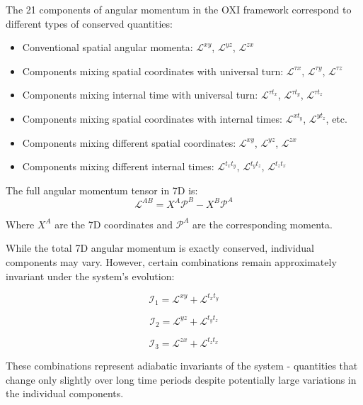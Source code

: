 \documentclass{article}
\begin{document}
The 21 components of angular momentum in the OXI framework correspond to different types of conserved quantities:

\begin{itemize}
\item Conventional spatial angular momenta: $\mathcal{L}^{xy}$, $\mathcal{L}^{yz}$, $\mathcal{L}^{zx}$
\item Components mixing spatial coordinates with universal turn: $\mathcal{L}^{\tau x}$, $\mathcal{L}^{\tau y}$, $\mathcal{L}^{\tau z}$
\item Components mixing internal time with universal turn: $\mathcal{L}^{\tau t_x}$, $\mathcal{L}^{\tau t_y}$, $\mathcal{L}^{\tau t_z}$
\item Components mixing spatial coordinates with internal times: $\mathcal{L}^{x t_y}$, $\mathcal{L}^{y t_z}$, etc.
\item Components mixing different spatial coordinates: $\mathcal{L}^{xy}$, $\mathcal{L}^{yz}$, $\mathcal{L}^{zx}$
\item Components mixing different internal times: $\mathcal{L}^{t_x t_y}$, $\mathcal{L}^{t_y t_z}$, $\mathcal{L}^{t_z t_x}$
\end{itemize}

The full angular momentum tensor in 7D is:
\begin{equation}
\mathcal{L}^{AB} = X^A \mathcal{P}^B - X^B \mathcal{P}^A
\end{equation}

Where $X^A$ are the 7D coordinates and $\mathcal{P}^A$ are the corresponding momenta.

While the total 7D angular momentum is exactly conserved, individual components may vary. However, certain combinations remain approximately invariant under the system's evolution:

\begin{equation}
\mathcal{I}_1 = \mathcal{L}^{xy} + \mathcal{L}^{t_x t_y}
\end{equation}

\begin{equation}
\mathcal{I}_2 = \mathcal{L}^{yz} + \mathcal{L}^{t_y t_z}
\end{equation}

\begin{equation}
\mathcal{I}_3 = \mathcal{L}^{zx} + \mathcal{L}^{t_z t_x}
\end{equation}

These combinations represent adiabatic invariants of the system - quantities that change only slightly over long time periods despite potentially large variations in the individual components.
\end{document}
